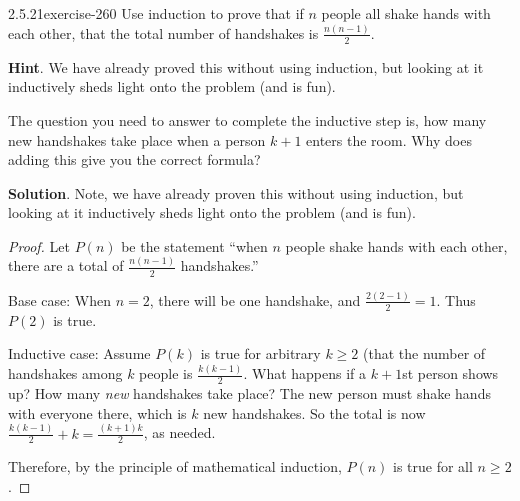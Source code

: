 \documentclass[twoside,11pt,]{book}
\numberwithin{equation}{chapter}
\begin{document}
\begin{divisionsolution}{2.5.21}{}{exercise-260}%
\hypertarget{p-3671}{}%
Use induction to prove that if \(n\) people all shake hands with each other, that the total number of handshakes is \(\frac{n(n-1)}{2}\).%
\par\smallskip%
\noindent\textbf{Hint}.\quad%
\hypertarget{p-3672}{}%
We have already proved this without using induction, but looking at it inductively sheds light onto the problem (and is fun).%
\par
\hypertarget{p-3673}{}%
The question you need to answer to complete the inductive step is, how many new handshakes take place when a person \(k+1\) enters the room.  Why does adding this give you the correct formula?%
\par\smallskip%
\noindent\textbf{Solution}.\quad%
\hypertarget{p-3674}{}%
Note, we have already proven this without using induction, but looking at it inductively sheds light onto the problem (and is fun).%
\begin{proof}{}
\hypertarget{p-3675}{}%
Let \(P(n)\) be the statement ``when \(n\) people shake hands with each other, there are a total of \(\frac{n(n-1)}{2}\) handshakes.''%
\par
\hypertarget{p-3676}{}%
Base case: When \(n=2\), there will be one handshake, and \(\frac{2(2-1)}{2} = 1\). Thus \(P(2)\) is true.%
\par
\hypertarget{p-3677}{}%
Inductive case: Assume \(P(k)\) is true for arbitrary \(k\ge 2\) (that the number of handshakes among \(k\) people is \(\frac{k(k-1)}{2}\). What happens if a \(k+1\)st person shows up? How many \emph{new} handshakes take place? The new person must shake hands with everyone there, which is \(k\) new handshakes. So the total is now \(\frac{k(k-1)}{2} + k = \frac{(k+1)k}{2}\), as needed.%
\par
\hypertarget{p-3678}{}%
Therefore, by the principle of mathematical induction, \(P(n)\) is true for all \(n \ge 2\).%
\end{proof}
\end{divisionsolution}%
\end{document}
